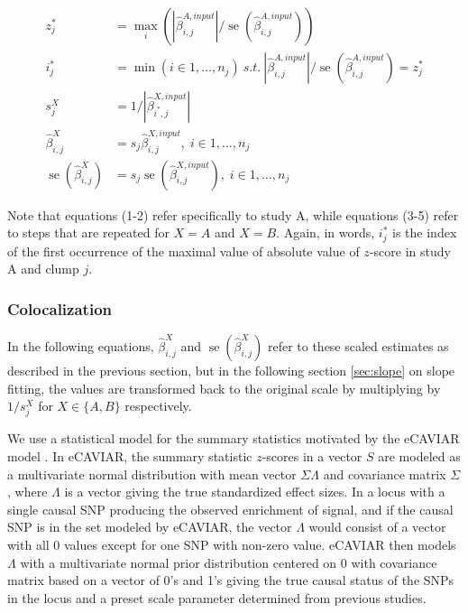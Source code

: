 \documentclass[11pt]{article}
\DeclareMathOperator{\se}{\textrm{se}}
\begin{document}
\begin{align}
  z^*_j &= \max_i \left( |\widehat{\beta}^{A,input}_{i,j}|/\se(\widehat{\beta}^{A,input}_{i,j}) \right) \\
  i^*_j &= \min \left(i \in 1,\dots,n_j \right) \  s.t. \  |\widehat{\beta}^{A,input}_{i,j}|/\se(\widehat{\beta}^{A,input}_{i,j}) = z^*_j \\
  s^X_j &= 1/|\widehat{\beta}^{X,input}_{i^*,j}| \\
  \widehat{\beta}^X_{i,j} &= s_j \widehat{\beta}^{X,input}_{i,j}, \; i \in 1,\dots,n_j \\
  \se(\widehat{\beta}^X_{i,j}) &= s_j \se(\widehat{\beta}^{X,input}_{i,j}), \; i \in 1,\dots,n_j
\end{align}

Note that equations (1-2) refer specifically to study A, while
equations (3-5) refer to steps that are repeated for $X=A$ and
$X=B$. Again, in words, $i^*_j$ is the index of the first occurrence of
the maximal value of absolute value of $z$-score in study A and clump
$j$.

\subsubsection{Colocalization}

In the following equations, $\widehat{\beta}^X_{i,j}$ and
$\se(\widehat{\beta}^X_{i,j})$ refer to these scaled estimates as
described in the previous section, but in the following section
\ref{sec:slope} on slope fitting, the values are transformed back to
the original scale by multiplying by $1/s^X_j$ for $X \in \{A,B\}$
respectively.

We use a statistical model for the summary statistics motivated by the
eCAVIAR model \citep{eCAVIAR}. In eCAVIAR, the summary statistic
$z$-scores in a vector $S$ are modeled as a multivariate normal
distribution with mean vector $\Sigma \Lambda$ and covariance matrix
$\Sigma$, where $\Lambda$ is a vector giving the true standardized
effect sizes. In a locus with a single causal SNP producing the
observed enrichment of signal, and if the causal SNP is in the set
modeled by eCAVIAR, the vector $\Lambda$ would consist of a vector
with all 0 values except for one SNP with non-zero value.
eCAVIAR then models $\Lambda$ with a multivariate normal prior
distribution centered on 0 with covariance matrix based on a vector of
0's and 1's giving the true causal status of the SNPs in the locus and
a preset scale parameter determined from previous studies.
\end{document}

